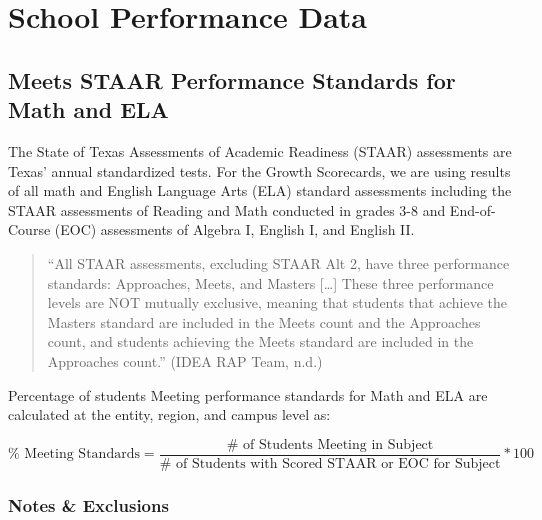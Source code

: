 \documentclass[
  letterpaper,
  DIV=11,
  numbers=noendperiod]{scrreprt}
\begin{document}

\chapter{School Performance Data}\label{sec-Performance}

\section{Meets STAAR Performance Standards for Math and
ELA}\label{sec-STAAR}

The State of Texas Assessments of Academic Readiness (STAAR) assessments
are Texas' annual standardized tests. For the Growth Scorecards, we are
using results of all math and English Language Arts (ELA) standard
assessments including the STAAR assessments of Reading and Math
conducted in grades 3-8 and End-of-Course (EOC) assessments of Algebra
I, English I, and English II.

\begin{quote}
``All STAAR assessments, excluding STAAR Alt 2, have three performance
standards: Approaches, Meets, and Masters {[}\ldots{]} These three
performance levels are NOT mutually exclusive, meaning that students
that achieve the Masters standard are included in the Meets count and
the Approaches count, and students achieving the Meets standard are
included in the Approaches count.'' (IDEA RAP Team, n.d.)
\end{quote}

Percentage of students Meeting performance standards for Math and ELA
are calculated at the entity, region, and campus level as:

\[\% \text{ Meeting Standards} = \frac{\# \text{ of Students Meeting in Subject}}{\# \text{ of Students with Scored STAAR or EOC for Subject}}*100\]

\subsection{Notes \& Exclusions}\label{notes-exclusions}
\end{document}
